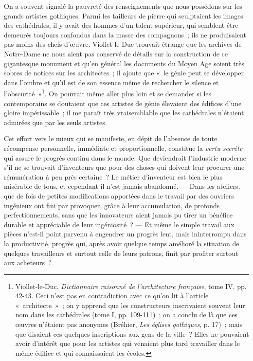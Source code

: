 \documentclass[french,twoside]{book} %
\begin{document}
On a souvent signalé la pauvreté des renseignements que nous possédons sur les grands artistes gothiques. Parmi les tailleurs de pierre qui sculptaient les images des cathédrales, il y avait des hommes d’un talent  supérieur, qui semblent être demeurés toujours confondus dans la masse des compagnons ; ils ne produisaient pas moins des chefs-d’œuvre. Viollet-le-Duc trouvait étrange que les archives de Notre-Dame ne nous aient pas conservé de détails sur la construction de ce gigantesque monument et qu’en général les documents du Moyen Age soient très sobres de notices sur les architectes ; il ajoute que « le génie peut se développer dans l’ombre et qu’il est de son essence même de rechercher le silence et l’obscurité »\footnote{ \noindent Viollet-le-Duc, \emph{Dictionnaire raisonné de l’architecture française}, tome IV, pp. 42-43. Ceci n’est pas en contradiction avec ce qu’on lit à l’article « architecte » ; on y apprend que les constructeurs inscrivaient souvent leur nom dans les cathédrales (tome I, pp. 109-111) ; on a conclu de là que ces œuvres n’étaient pas anonymes (Bréhier, \emph{Les églises gothiques}, p. 17) ; mais que disaient ces quelques inscriptions aux gens de la ville ? Elles ne pouvaient avoir d’intérêt que pour les artistes qui venaient plus tard travailler dans le même édifice et qui connaissaient les écoles.
 }. On pourrait même aller plus loin et se demander si les contemporains se doutaient que ces artistes de génie élevaient des édifices d’une gloire impérissable ; il me paraît très vraisemblable que les cathédrales n’étaient admirées que par les seuls artistes.\par
Cet effort vers le mieux qui se manifeste, en dépit de l’absence de toute récompense personnelle, immédiate et proportionnelle, constitue la \emph{vertu secrète} qui assure le progrès continu dans le monde. Que deviendrait l’industrie moderne s’il ne se trouvait d’inventeurs que pour des choses qui doivent leur procurer une rémunération à peu près certaine ? Le métier d’inventeur est bien  le plus misérable de tous, et cependant il n’est jamais abandonné. — Dans les ateliers, que de fois de petites modifications apportées dans le travail par des ouvriers ingénieux ont fini par provoquer, grâce à leur accumulation, de profonds perfectionnements, sans que les innovateurs aient jamais pu tirer un bénéfice durable et appréciable de leur ingéniosité ? — Et même le simple travail aux pièces n’est-il point parvenu à engendrer un progrès lent, mais ininterrompu dans la productivité, progrès qui, après avoir quelque temps amélioré la situation de quelques travailleurs et surtout celle de leurs patrons, finit par profiter surtout aux acheteurs ?\par
\end{document}
